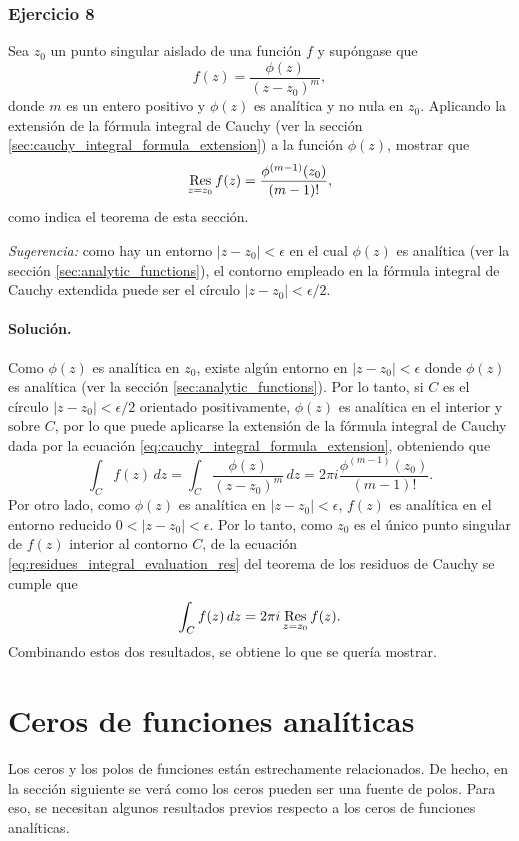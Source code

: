 \documentclass[a4paper]{report}
\def\Res{\qopname\relax m{Res}}
\begin{document}
\subsubsection*{Ejercicio 8}

Sea \(z_0\) un punto singular aislado de una función \(f\) y supóngase que 
\[
 f(z)=\frac{\phi(z)}{(z-z_0)^m},
\]
donde \(m\) es un entero positivo y \(\phi(z)\) es analítica y no nula en \(z_0\). Aplicando la extensión de la fórmula integral de Cauchy (ver la sección \ref{sec:cauchy_integral_formula_extension}) a la función \(\phi(z)\), mostrar que 
\[
 \Res_{z=z_0}f(z)=\frac{\phi^{(m-1)}(z_0)}{(m-1)!},
\]
como indica el teorema de esta sección.

\emph{Sugerencia:} como hay un entorno \(|z-z_0|<\epsilon\) en el cual \(\phi(z)\) es analítica (ver la sección \ref{sec:analytic_functions}), el contorno empleado en la fórmula integral de Cauchy extendida puede ser el círculo \(|z-z_0|<\epsilon/2\).

\paragraph{Solución.} Como \(\phi(z)\) es analítica en \(z_0\), existe algún entorno en \(|z-z_0|<\epsilon\) donde \(\phi(z)\) es analítica (ver la sección \ref{sec:analytic_functions}). Por lo tanto, si \(C\) es el círculo \(|z-z_0|<\epsilon/2\) orientado positivamente, \(\phi(z)\) es analítica en el interior y sobre \(C\), por lo que puede aplicarse la extensión de la fórmula integral de Cauchy dada por la ecuación \ref{eq:cauchy_integral_formula_extension}, obteniendo que 
\[
 \int_Cf(z)\,dz=\int_C\frac{\phi(z)}{(z-z_0)^m}\,dz=2\pi i\frac{\phi^{(m-1)}(z_0)}{(m-1)!}.
\]
Por otro lado, como \(\phi(z)\) es analítica en \(|z-z_0|<\epsilon\), \(f(z)\) es analítica en el entorno reducido \(0<|z-z_0|<\epsilon\). Por lo tanto, como \(z_0\) es el único punto singular de \(f(z)\) interior al contorno \(C\), de la ecuación \ref{eq:residues_integral_evaluation_res} del teorema de los residuos de Cauchy se cumple que
\[
 \int_C f(z)\,dz=2\pi i\Res_{z=z_0}f(z).
\]
Combinando estos dos resultados, se obtiene lo que se quería mostrar.

\section{Ceros de funciones analíticas}\label{sec:zeros_of_analytic_functions}

Los ceros y los polos de funciones están estrechamente relacionados. De hecho, en la sección siguiente se verá como los ceros pueden ser una fuente de polos. Para eso, se necesitan algunos resultados previos respecto a los ceros de funciones analíticas.
\end{document}
